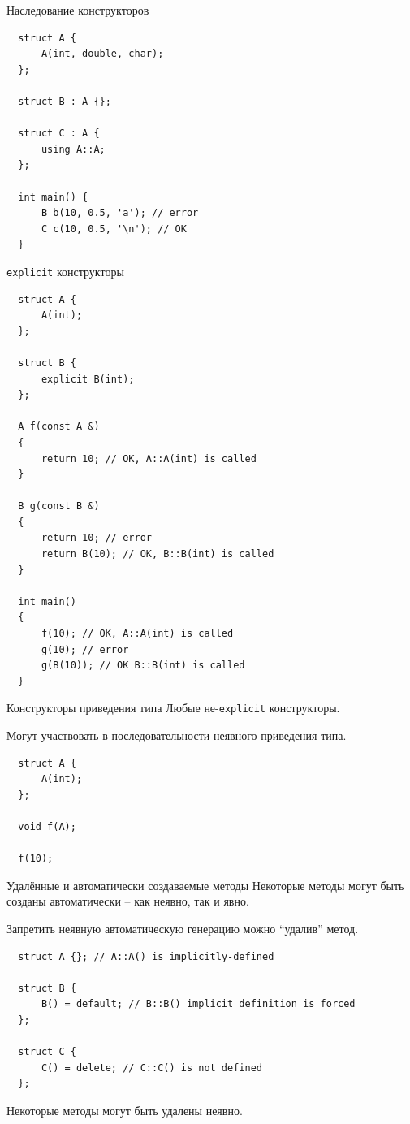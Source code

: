 \documentclass[unknownkeysallowed,xcolor=table]{beamer}
\begin{document}
\begin{frame}[fragile]{Наследование конструкторов}
  \begin{lstlisting}
  struct A {
      A(int, double, char);
  };

  struct B : A {};

  struct C : A {
      using A::A;
  };

  int main() {
      B b(10, 0.5, 'a'); // error
      C c(10, 0.5, '\n'); // OK
  }
  \end{lstlisting}
\end{frame}

\begin{frame}[fragile]{\lstinline{explicit} конструкторы}
  \begin{lstlisting}
  struct A {
      A(int);
  };

  struct B {
      explicit B(int);
  };

  A f(const A &)
  {
      return 10; // OK, A::A(int) is called
  }

  B g(const B &)
  {
      return 10; // error
      return B(10); // OK, B::B(int) is called
  }

  int main()
  {
      f(10); // OK, A::A(int) is called
      g(10); // error
      g(B(10)); // OK B::B(int) is called
  }
  \end{lstlisting}
\end{frame}

\begin{frame}[fragile]{Конструкторы приведения типа}
  Любые не-\lstinline{explicit} конструкторы.

  \vspace{1em}

  Могут участвовать в последовательности неявного приведения типа.

  \begin{lstlisting}
  struct A {
      A(int);
  };

  void f(A);

  f(10);
  \end{lstlisting}
\end{frame}

\begin{frame}[fragile]{Удалённые и автоматически создаваемые методы}
  Некоторые методы могут быть созданы автоматически -- как неявно, так и явно.

  \vspace{0.5em}

  Запретить неявную автоматическую генерацию можно ``удалив'' метод.
  \begin{lstlisting}
  struct A {}; // A::A() is implicitly-defined

  struct B {
      B() = default; // B::B() implicit definition is forced
  };

  struct C {
      C() = delete; // C::C() is not defined
  };
  \end{lstlisting}

  Некоторые методы могут быть удалены неявно.
\end{frame}
\end{document}
